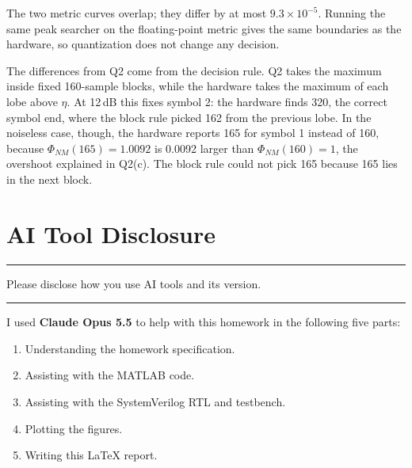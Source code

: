 \documentclass[12pt,a4paper]{report}
\newcommand{\question}[1]{%
    \hrule
    \vspace{0.2cm}
    #1
    \vspace{0.2cm}
    \hrule
    \vspace{0.5cm}
}
\begin{document}
The two metric curves overlap; they differ by at most $9.3 \times 10^{-5}$. Running the same peak searcher on the
floating-point metric gives the same boundaries as the hardware, so quantization does not change any decision.

The differences from Q2 come from the decision rule. Q2 takes the maximum inside fixed 160-sample blocks, while the
hardware takes the maximum of each lobe above $\eta$. At 12\,dB this fixes symbol 2: the hardware finds 320, the
correct symbol end, where the block rule picked 162 from the previous lobe. In the noiseless case, though, the hardware
reports 165 for symbol 1 instead of 160, because $\Phi_{NM}(165) = 1.0092$ is 0.0092 larger than
$\Phi_{NM}(160) = 1$, the overshoot explained in Q2(c). The block rule could not pick 165 because 165 lies in the next block.

\newpage

\chapter{AI Tool Disclosure}
\label{ch:ai}
\question{Please disclose how you use AI tools and its version.}

I used \textbf{Claude Opus 5.5} to help with this homework in the following five parts:
\begin{enumerate}[label=(\arabic*)]
    \item Understanding the homework specification.
    \item Assisting with the MATLAB code.
    \item Assisting with the SystemVerilog RTL and testbench.
    \item Plotting the figures.
    \item Writing this \LaTeX{} report.
\end{enumerate}
\end{document}
